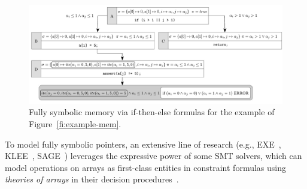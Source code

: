 \begin{itemize}

\end{itemize}

\begin{figure}[t]
\begin{center}
\includegraphics[width=0.7\columnwidth]{images/memory-ite} %
\end{center}
\vspace{-2.5mm}
\caption{Fully symbolic memory via if-then-else formulas for the example of Figure~\ref{fi:example-mem}.}
\label{fi:memory-ite}
\end{figure}

\noindent To model fully symbolic pointers, an extensive line of research (e.g., {\sc EXE}~\cite{EXE-CCS06}, {\sc KLEE}~\cite{KLEE-OSDI08}, {\sc SAGE}~\cite{EGL-ISSTA09}) leverages the expressive power of some SMT solvers, which can model operations on arrays as first-class entities in constraint formulas using {\em theories of arrays} in their decision procedures~\cite{STP-CAV07}.

